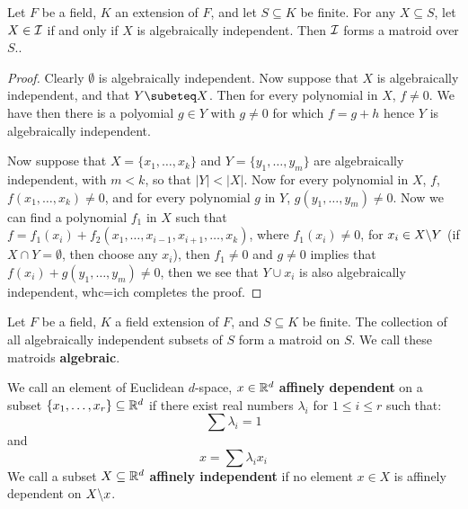 \begin{theorem}\label{1.2.3}
    Let $F$ be a field,  $K$ an extension of  $F$, and let  $S \subseteq K$ be finite.  For any $X
    \subseteq S$, let  $X \in \mathcal{I}$ if and only if  $X$ is algebraically independent. Then  $\mathcal{I}$
    forms a matroid over  $S$..
\end{theorem}
\begin{proof}
    Clearly $\emptyset$ is algebraically independent. Now suppose that $X$
    is algebraically independent, and that  $Y \subeteq X$. Then for every polynomial 
    in $X$, $f \neq 0$. We have then there is a polyomial $g \in Y$ with $g \neq 0$ for which
     $f=g+h$ hence $Y$ is algebraically independent.

     Now suppose that $X=\{x_1, \dots, x_k\}$ and $Y=\{y_1, \dots, y_m\}$ are algebraically
     independent, with $m<k$, so that  $|Y|<|X|$. Now for every polynomial in $X$, $f$, $f(x_1,
     \dots, x_k) \neq 0$, and for every polynomial $g$ in  $Y$,  $g(y_1, \dots, y_m) \neq 0$. Now we
     can find a polynomial $ f_1$ in $X$ such that  $f=f_1(x_i)+f_2(x_1, \dots, x_{i-1},x_{i+1},
     \dots, x_k)$, where $ f_1(x_i) \neq 0$, for $x_i \in X\backslash Y$ (if $X \cap Y=\emptyset$, then
     choose any  $x_i$), then $f_1 \neq 0$ and $g \neq 0$ implies that  $f(x_i)+g(y_1, \dots, y_m)
     \neq 0$, then we see that $Y \cup x_i$ is also algebraically independent, whc=ich completes the
     proof.
\end{proof}

\begin{definition}
    Let $F$ be a field,  $K$ a field extension of  $F$, and  $S \subseteq K$ be finite. The
    collection of all algebraically independent subsets of  $S$ form a matroid on  $S$. We call
    these matroids \textbf {algebraic}.		
\end{definition}

\begin{definition}
    We call an element of Euclidean $d$-space, $x \in \mathbb{R}^d$ \textbf{affinely dependent} on a subset
    $\{x_1, \dots, x_r\} \subseteq \mathbb{R}^d$ if there exist real numbers $\lambda_i$ for  $1 \leq i \leq
    r$ such that:
        \begin{equation}
            \sum{\lambda_i}=1
        \end{equation}
    and
        \begin{equation}
            x=\sum{\lambda_ix_i}
        \end{equation} 
        We call a subset $X \subseteq \mathbb{R}^d$ \textbf {affinely independent} if no element $x \in X$ is
        affinely dependent on  $X\backslash x$.
\end{definition}

